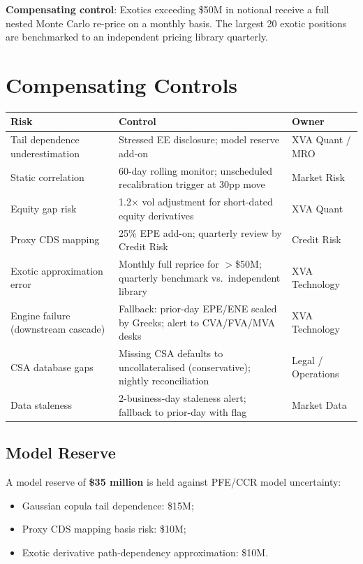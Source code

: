 \documentclass[11pt,a4paper]{article}
\begin{document}
\textbf{Compensating control}: Exotics exceeding \$50M in notional receive a
full nested Monte Carlo re-price on a monthly basis. The largest 20 exotic
positions are benchmarked to an independent pricing library quarterly.

\section{Compensating Controls}
\label{sec:controls}

\begin{longtable}{@{}lll@{}}
\toprule
\textbf{Risk} & \textbf{Control} & \textbf{Owner} \\
\midrule
\endhead
\bottomrule
\endfoot
Tail dependence underestimation
  & Stressed EE disclosure; model reserve add-on
  & XVA Quant / MRO \\
Static correlation
  & 60-day rolling monitor; unscheduled recalibration trigger at 30pp move
  & Market Risk \\
Equity gap risk
  & 1.2$\times$ vol adjustment for short-dated equity derivatives
  & XVA Quant \\
Proxy CDS mapping
  & 25\% EPE add-on; quarterly review by Credit Risk
  & Credit Risk \\
Exotic approximation error
  & Monthly full reprice for $>$\$50M; quarterly benchmark vs.\ independent library
  & XVA Technology \\
Engine failure (downstream cascade)
  & Fallback: prior-day EPE/ENE scaled by Greeks; alert to CVA/FVA/MVA desks
  & XVA Technology \\
CSA database gaps
  & Missing CSA defaults to uncollateralised (conservative); nightly reconciliation
  & Legal / Operations \\
Data staleness
  & 2-business-day staleness alert; fallback to prior-day with flag
  & Market Data \\
\end{longtable}

\subsection{Model Reserve}

A model reserve of \textbf{\$35 million} is held against PFE/CCR model
uncertainty:

\begin{itemize}[noitemsep]
  \item Gaussian copula tail dependence: \$15M;
  \item Proxy CDS mapping basis risk: \$10M;
  \item Exotic derivative path-dependency approximation: \$10M.
\end{itemize}
\end{document}
